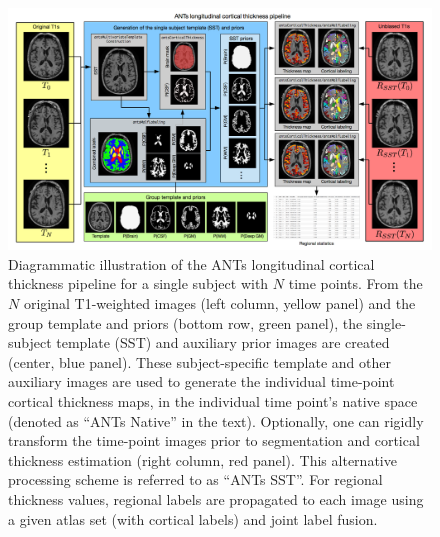 \documentclass[]{article}
\title{}
\author{}
\date{}
\begin{document}
\newpage

\begin{figure}
\centering
\includegraphics[width=\textwidth]{Figure3.pdf}
\caption{Diagrammatic illustration of the ANTs longitudinal cortical thickness pipeline
for a single subject with $N$ time points.  From the $N$ original T1-weighted
images (left column, yellow panel) and the group template and priors (bottom row,
green panel), the single-subject template (SST) and auxiliary prior images
are created (center, blue panel).  These subject-specific template and other
auxiliary images are used to generate the individual time-point cortical
thickness maps, in the individual time point's native space (denoted as
``ANTs Native'' in the text).  Optionally, one can
rigidly transform the time-point images prior to segmentation and cortical thickness
estimation (right column, red panel).  This alternative processing scheme is referred
to as ``ANTs SST''.  For regional thickness values, regional labels
are propagated to each image using a given atlas set (with cortical labels)
and joint label fusion.}
\label{fig:pipeline}
\end{figure}

\newpage
\end{document}
